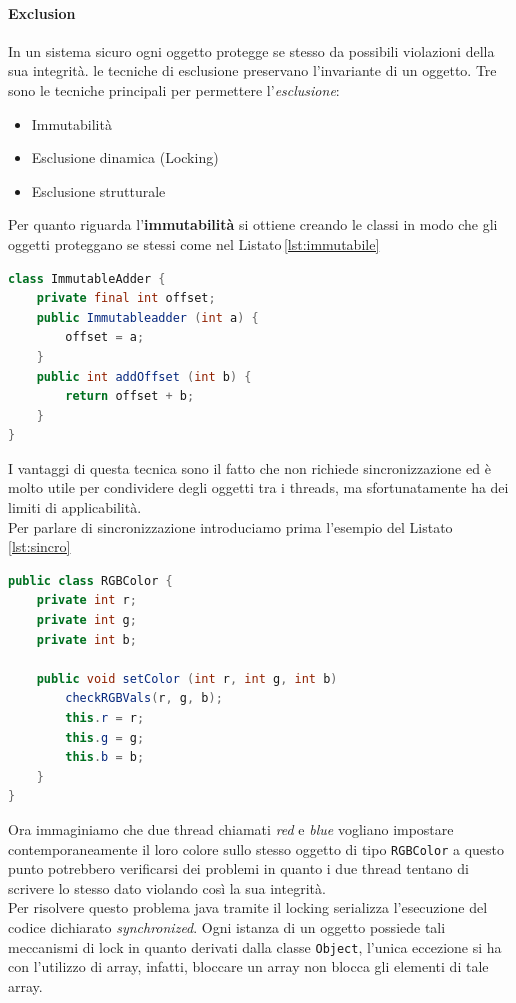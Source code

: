 \paragraph{Exclusion}
In un sistema sicuro ogni oggetto protegge se stesso da possibili violazioni della sua integrità. le tecniche di esclusione preservano l'invariante di un oggetto. Tre sono le tecniche principali per permettere l'\emph{esclusione}:
\begin{itemize}
\item Immutabilità
\item Esclusione dinamica (Locking)
\item Esclusione strutturale
\end{itemize}
Per quanto riguarda l'\textbf{immutabilità} si ottiene creando le classi in modo che gli oggetti proteggano se stessi come nel Listato\,\ref{lst:immutabile}
\begin{lstlisting}[language=Java,caption={Esempio di oggetto immutabile},label=lst:immutabile]
class ImmutableAdder {
	private final int offset;
	public Immutableadder (int a) {
		offset = a;
	}
	public int addOffset (int b) {
		return offset + b;
	}
}
\end{lstlisting}
I vantaggi di questa tecnica sono il fatto che non richiede sincronizzazione ed è molto utile per condividere degli oggetti tra i threads, ma sfortunatamente ha dei limiti di applicabilità.\\
Per parlare di sincronizzazione introduciamo prima l'esempio del Listato\,\ref{lst:sincro}
\begin{lstlisting}[language=Java,caption={Esempio sincronizzazione},label=lst:sincro]
public class RGBColor {
	private int r;
	private int g;
	private int b;
	
	public void setColor (int r, int g, int b)
		checkRGBVals(r, g, b);
		this.r = r;
		this.g = g;
		this.b = b;
	}
}
\end{lstlisting}
Ora immaginiamo che due thread chiamati \emph{red} e \emph{blue} vogliano impostare contemporaneamente il loro colore sullo stesso oggetto di tipo \texttt{RGBColor} a questo punto potrebbero verificarsi dei problemi in quanto i due thread tentano di scrivere lo stesso dato violando così la sua integrità.\\
Per risolvere questo problema java tramite il locking serializza l'esecuzione del codice dichiarato \emph{synchronized}. Ogni istanza di un oggetto possiede tali meccanismi di lock in quanto derivati dalla classe \texttt{Object}, l'unica eccezione si ha con l'utilizzo di array, infatti, bloccare un array non blocca gli elementi di tale array.\\
